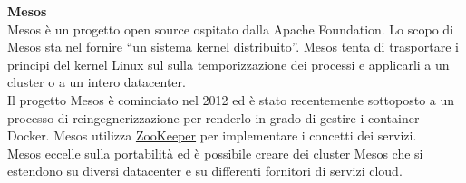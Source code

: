 \textbf{Mesos}\\
Mesos è un progetto open source ospitato dalla Apache Foundation. Lo scopo di Mesos sta nel fornire “un sistema kernel distribuito”. Mesos tenta di trasportare i principi del kernel Linux sul sulla temporizzazione dei processi e applicarli a un cluster o a un intero datacenter.\\
Il progetto Mesos è cominciato nel 2012 ed è stato recentemente sottoposto a un processo di reingegnerizzazione per renderlo in grado di gestire i container Docker. Mesos utilizza \href{https://zookeeper.apache.org/}{ZooKeeper} per implementare i concetti dei servizi.\\
Mesos eccelle sulla portabilità ed è possibile creare dei cluster Mesos che si estendono su diversi datacenter e su differenti fornitori di servizi cloud.\\